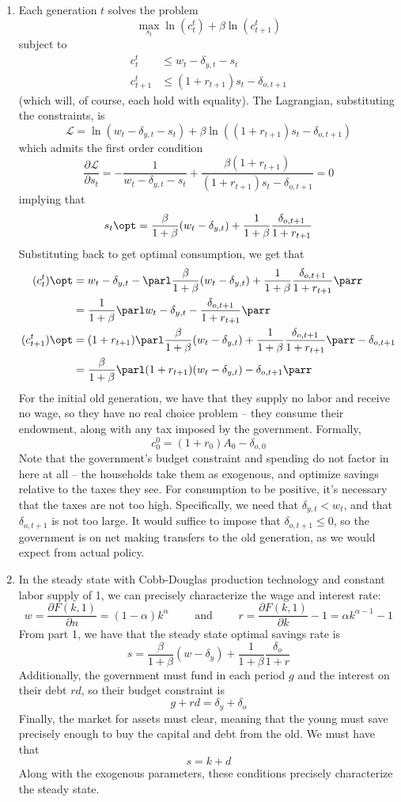 \documentclass[10pt]{article}
\begin{document}
\begin{enumerate}
	\item Each generation $t$ solves the problem \[\max_{s_t} \ln(c^t_t) + \beta \ln(c^t_{t+1})\]subject to \begin{align*} c_t^t &\le w_t - \delta_{y,t} - s_t \\ c_{t+1}^t &\le (1+r_{t+1})s_t - \delta_{o,t+1} \end{align*}(which will, of course, each hold with equality). The Lagrangian, substituting the constraints, is \[\mathcal{L} = \ln(w_t - \delta_{y,t} - s_t) + \beta \ln((1+r_{t+1})s_t - \delta_{o,t+1})\]which admits the first order condition\[\frac{\partial \mathcal{L}}{\partial s_t} = -\frac{1}{w_t - \delta_{y,t}-s_t} + \frac{\beta(1+r_{t+1})}{(1+r_{t+1})s_t - \delta_{o,t+1}} = 0\]implying that \[s_t\opt = \frac{\beta}{1+\beta}(w_t - \delta_{y,t}) + \frac{1}{1+\beta}\frac{\delta_{o,t+1}}{1+r_{t+1}}\]Substituting back to get optimal consumption, we get that \begin{align*} (c_t^t)\opt &= w_t - \delta_{y,t} - \parl \frac{\beta}{1+\beta}(w_t - \delta_{y,t}) + \frac{1}{1+\beta}\frac{\delta_{o,t+1}}{1+r_{t+1}}\parr \\ &= \frac{1}{1+\beta}\parl w_t - \delta_{y,t} - \frac{\delta_{o,t+1}}{1+r_{t+1}}\parr \\ (c_{t+1}^t)\opt &= (1+r_{t+1})\parl \frac{\beta}{1+\beta}(w_t - \delta_{y,t}) + \frac{1}{1+\beta}\frac{\delta_{o,t+1}}{1+r_{t+1}}\parr - \delta_{o,t+1} \\ &= \frac{\beta}{1+\beta}\parl (1+r_{t+1})(w_t-\delta_{y,t}) - \delta_{o,t+1}\parr \end{align*}For the initial old generation, we have that they supply no labor and receive no wage, so they have no real choice problem -- they consume their endowment, along with any tax imposed by the government. Formally,\[c^0_0 = (1+r_0)A_0 - \delta_{o,0}\]Note that the government's budget constraint and spending do not factor in here at all -- the households take them as exogenous, and optimize savings relative to the taxes they see. For consumption to be positive, it's necessary that the taxes are not too high. Specifically, we need that $\delta_{y,t} < w_t$, and that $\delta_{o,t+1}$ is not too large. It would suffice to impose that $\delta_{o,t+1} \le 0$, so the government is on net making transfers to the old generation, as we would expect from actual policy.
	\item In the steady state with Cobb-Douglas production technology and constant labor supply of 1, we can precisely characterize the wage and interest rate:\[w = \frac{\partial F(k,1)}{\partial n} = (1-\alpha)k^\alpha \qquad \text{ and } \qquad r = \frac{\partial F(k,1)}{\partial k} - 1 = \alpha k^{\alpha -1}-1\]From part 1, we have that the steady state optimal savings rate is \[s = \frac{\beta}{1+\beta} (w - \delta_y) + \frac{1}{1+\beta} \frac{\delta_o}{1+r}\]Additionally, the government must fund in each period $g$ and the interest on their debt $rd$, so their budget constraint is \[g + rd = \delta_y + \delta_o\]Finally, the market for assets must clear, meaning that the young must save precisely enough to buy the capital and debt from the old. We must have that \[s = k + d\]Along with the exogenous parameters, these conditions precisely characterize the steady state.

\end{enumerate}
\end{document}
